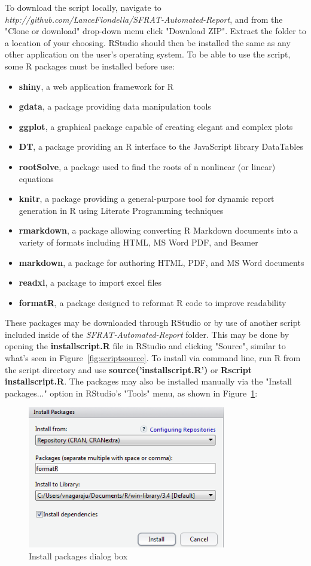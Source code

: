 \documentclass[conference]{IEEEtran}
\begin{document}
To download the script locally, navigate to \textit{http://github.com/LanceFiondella/SFRAT-Automated-Report}, and from the "Clone or download" drop-down menu click "Download ZIP". Extract the folder to a location of your choosing. RStudio should then be installed the same as any other application on the user's operating system. To be able to use the script, some R packages must be installed before use:
\begin{itemize}
	\item {\textbf{shiny}, a web application framework for R}
	\item {\textbf{gdata}, a package providing data manipulation tools}
	\item {\textbf{ggplot}, a graphical package capable of creating elegant and complex plots}
	\item {\textbf{DT}, a package providing an R interface to the JavaScript library DataTables}
	\item {\textbf{rootSolve}, a package used to find the roots of n nonlinear (or linear) equations}
	\item {\textbf{knitr}, a package providing a general-purpose tool for dynamic report generation in R using Literate Programming techniques}
	\item {\textbf{rmarkdown}, a package allowing converting R Markdown documents into a variety of formats including HTML, MS Word PDF, and Beamer}
	\item {\textbf{markdown}, a package for authoring HTML, PDF, and MS Word documents}
	\item {\textbf{readxl}, a package to import excel files}
	\item {\textbf{formatR}, a package designed to reformat R code to improve readability}
 \end{itemize}
 
These packages may be downloaded through RStudio or by use of another script included inside of the \textit{SFRAT-Automated-Report} folder. This may be done by opening the \textbf{installscript.R} file in RStudio and clicking "Source", similar to what's seen in Figure~\ref{fig:scriptsource}. To install via command line, run R from the script directory and use \textbf{source('installscript.R')} or \textbf{Rscript installscript.R}. The packages may also be installed manually via the "Install packages..." option in RStudio's "Tools" menu, as shown in Figure~\ref{fig:InstallPackages}:
	\begin{figure}[!h]
	\centering
	\includegraphics[width=3.4in]{Figures/InstallPackages}
	\caption{Install packages dialog box}
	\label{fig:InstallPackages}
	\end{figure}
\end{document}
